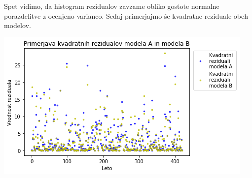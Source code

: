 \documentclass[12pt, a4paper]{article}
\begin{document}
\begin{figure}[h]
\end{figure}

Spet vidimo, da histogram rezidualov zavzame obliko gostote normalne porazdelitve 
z ocenjeno varianco. Sedaj primerjajmo še kvadratne reziduale obeh modelov. 

\begin{center}
    \includegraphics[scale=0.7]{Naloga_3_11}
\end{center}
\end{document}
